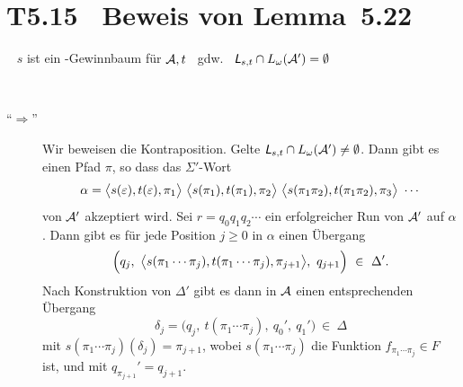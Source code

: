 \documentclass[fontsize=11pt, twoside=false, numbers=autoenddot]{scrbook}
\begin{document}
\goodbreak
\section*{T5.15~ Beweis von Lemma~5.22}

~
$s$ ist ein \PF-Gewinnbaum für $\mathcal{A},t$
~gdw.~
$\textsf{\textit{L}}_{s,t} \cap L_\omega(\mathcal{A}') = \emptyset$

\par\medskip
\enlargethispage*{10mm}
~
\begin{description}
  \item[{\boldmath"`$\Rightarrow$"'}]
    Wir beweisen die Kontraposition.
    Gelte $\textsf{\textit{L}}_{s,t} \cap L_\omega(\mathcal{A}') \neq \emptyset$.
    Dann gibt es einen Pfad $\pi$,
    so dass das $\Sigma'$-Wort
    \[
      \alpha = 
      \big\langle s(\varepsilon),t(\varepsilon),\pi_1\big\rangle~
      \big\langle s(\pi_1),t(\pi_1),\pi_2\big\rangle~
      \big\langle s(\pi_1\pi_2),t(\pi_1\pi_2),\pi_3\big\rangle~
      \cdots
    \]
    von $\mathcal{A}'$ akzeptiert wird.
    Sei $r=q_0q_1q_2\cdots$ ein erfolgreicher Run von $\mathcal{A}'$ auf $\alpha$.
    Dann gibt es für jede Position $j \geq 0$ in $\alpha$ einen Übergang
    \[
      \Big(q_j,~\big\langle s(\pi_1\cdots\pi_j),t(\pi_1\cdots\pi_j),\pi_{j+1}\big\rangle,~q_{j+1}\Big) ~\in~ \Delta'.
    \]
    Nach Konstruktion von $\Delta'$ gibt es dann in $\mathcal{A}$ einen entsprechenden Übergang
    \[
      \delta_j = \Big(q_j,~t(\pi_1\cdots\pi_j),~q_0',~q_1'\Big) ~\in~ \Delta
    \]
    mit $s(\pi_1\cdots\pi_j)(\delta_j) = \pi_{j+1}$,
    wobei $s(\pi_1\cdots\pi_j)$ die Funktion $f_{\pi_1\cdots\pi_j} \in F$ ist,
    und mit $q_{\pi_{j+1}}'=q_{j+1}$.
    

\end{description}
\end{document}
